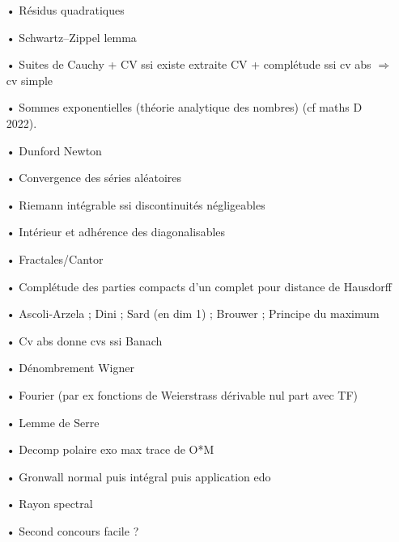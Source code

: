 \documentclass[11pt,a4paper]{article}
\begin{document}
\begin{itemize}
\item[•] Résidus quadratiques
\item[•] Schwartz–Zippel lemma
\item[•] Suites de Cauchy + CV ssi existe extraite CV + complétude ssi cv abs $\Rightarrow$ cv simple 
\item[•] Sommes exponentielles (théorie analytique des nombres) (cf maths D 2022).
\item[•] Dunford Newton
\item[•] Convergence des séries aléatoires
\item[•] Riemann intégrable ssi discontinuités négligeables
\item[•] Intérieur et adhérence des diagonalisables
\item[•] Fractales/Cantor
\item[•] Complétude des parties compacts d'un complet pour distance de Hausdorff
\item[•] Ascoli-Arzela ; Dini ; Sard (en dim 1) ; Brouwer ; Principe du maximum
\item[•] Cv abs donne cvs ssi Banach
\item[•] Dénombrement Wigner
\item[•] Fourier (par ex fonctions de Weierstrass dérivable nul part avec TF)
\item[•] Lemme de Serre
\item[•] Decomp polaire exo max trace de O*M
\item[•] Gronwall normal puis intégral puis application edo
\item[•] Rayon spectral
\item[•] Second concours facile ?
\end{itemize}
\end{document}
